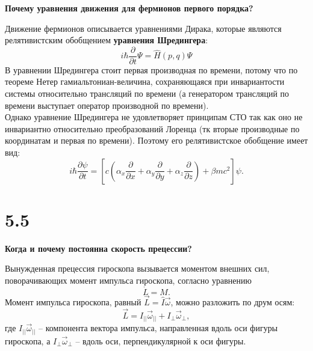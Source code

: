 \documentclass[a4paper,14pt]{article}
\begin{document}
\begin{center}
	\LARGE{\textbf{Почему уравнения движения для фермионов первого порядка?}}\\
\end{center}

Движение фермионов описывается уравнениями Дирака, которые являются релятивистским обобщением \textbf{уравнения Шредингера}:
\begin{equation}
	i \hbar \frac{\partial}{\partial t} \Psi=\hat{H}(p, q) \Psi
\end{equation}
В уравнении Шредингера стоит первая производная по времени, потому что по теореме Нетер гамиальтониан-величина, сохраняющаяся при инвариантости системы относительно трансляций по времени (а генератором трансляций по времени выступает оператор производной по времени).\\
Однако уравнение Шредингера не удовлетворяет принципам СТО так как оно не инвариантно относительно преобразований Лоренца (тк вторые производные по координатам и первая по времени). Поэтому его релятивистское обобщение имеет вид:
\begin{equation}
	i \hbar \frac{\partial \psi}{\partial t}=\left[c\left(\alpha_{x} \frac{\partial}{\partial x}+\alpha_{y} \frac{\partial}{\partial y}+\alpha_{z} \frac{\partial}{\partial z}\right)+\beta m c^{2}\right] \psi.
\end{equation}


\section*{5.5}

\begin{center}
	\LARGE{\textbf{Когда и почему постоянна скорость прецессии?}}\\
\end{center}

Вынужденная прецессия гироскопа вызывается моментом внешних сил, поворачивающих момент импульса гироскопа, согласно уравнению
$$
\dot L = M.
$$
Момент импульса гироскопа, равный $\vec{L} = \hat{I} \vec{\omega}$, можно разложить по друм осям:
$$
\vec{L} = I_{||} \vec{\omega}_{||} + I_{\perp} \vec{\omega}_{\perp},
$$
где $I_{||} \vec{\omega}_{||}$ -- компонента вектора импульса, направленная вдоль оси фигуры гироскопа, а $I_{\perp} \vec{\omega}_{\perp}$ -- вдоль оси, перпендикулярной к оси фигуры.
\end{document}
